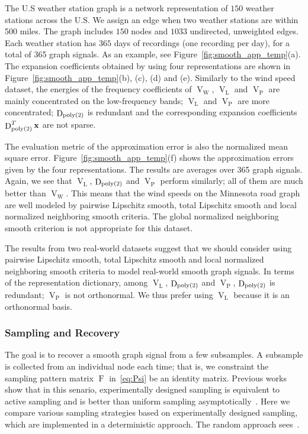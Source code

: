 \documentclass[journal,twocolumn,10pt]{IEEEtran}
\theoremstyle{definition}
\def\x{\mathbf{x}}
\DeclareMathOperator{\LL}{L}
\DeclareMathOperator{\D}{D}
\DeclareMathOperator{\F}{F}
\DeclareMathOperator{\Pj}{P}
\DeclareMathOperator{\Vm}{V}
\DeclareMathOperator{\W}{W}
\begin{document}
The U.S weather station graph is a network representation of $150$ weather stations across the U.S. We assign an edge when two 
weather stations are within 500 miles. The graph includes $150$ nodes and $1033$ undirected, unweighted edges. Each weather station has $365$ days of recordings (one recording per day), for a total of 365 graph signals. As an example, see Figure~\ref{fig:smooth_app_temp}(a). The expansion coefficients obtained by using four representations are shown in Figure~\ref{fig:smooth_app_temp}(b), (c), (d) and (e). 
Similarly to the wind speed dataset, the energies of the frequency coefficients of $\Vm_{\W}$, $\Vm_{\LL}$ and $\Vm_{\Pj}$ are mainly concentrated on the low-frequency bands; $\Vm_{\LL}$ and $\Vm_{\Pj}$ are more concentrated; $\D_{\rm poly(2)}$ is redundant and the corresponding expansion coefficients $\D_{\rm poly(2)}^T \x$ are not sparse.

The evaluation metric of the approximation error is also the normalized mean square error.  Figure~\ref{fig:smooth_app_temp}(f) shows the approximation errors given by the four representations. The results are averages over 365 graph signals. Again, we see that $\Vm_{\LL}$, $\D_{\rm poly(2)}$ and $\Vm_{\Pj}$ perform similarly; all of them are much better than $\Vm_{\W}$. This means that the wind speeds on the Minnesota road graph are well modeled by pairwise Lipschitz smooth, total Lipschitz smooth and local normalized neighboring smooth criteria. The global normalized neighboring smooth criterion is not appropriate for this dataset.

The results from two real-world datasets suggest that we should consider using pairwise Lipschitz smooth, total Lipschitz smooth and local normalized neighboring smooth criteria to model real-world smooth graph signals. In terms of the representation dictionary, among $\Vm_{\LL}$, $\D_{\rm poly(2)}$ and $\Vm_{\Pj}$, $\D_{\rm poly(2)}$ is redundant; $\Vm_{\Pj}$ is not orthonormal. We thus prefer using $\Vm_{\LL}$ because it is an orthonormal basis.

\subsubsection{Sampling and Recovery}
\label{sec:smooth_samplingandrecovery}
The goal is to recover a smooth graph signal from a few subsamples. A subsample is collected from an individual node each time; that is, we constraint the sampling pattern matrix $\F$ in~\eqref{eq:Psi} be an identity matrix. Previous works show that in this senario, experimentally designed sampling is equivalent to active sampling and is better than uniform sampling asymptotically~\cite{ChenVSK:15c}. Here we compare various sampling strategies based on experimentally designed sampling, which are implemented in a deterministic approach. The random approach sees~\cite{ChenVSK:15a}.
\end{document}
